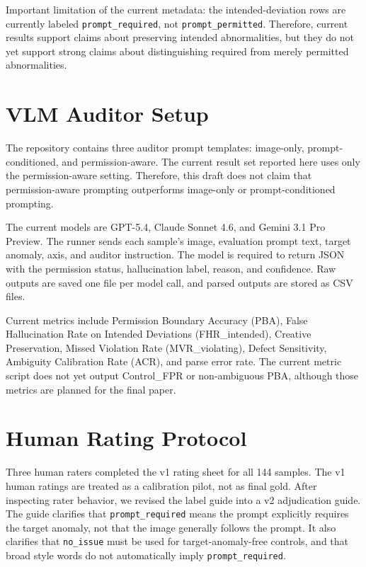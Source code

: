 \documentclass[11pt]{article}
\begin{document}
Important limitation of the current metadata: the intended-deviation rows are currently labeled \texttt{prompt\_required}, not \texttt{prompt\_permitted}. Therefore, current results support claims about preserving intended abnormalities, but they do not yet support strong claims about distinguishing required from merely permitted abnormalities.

\section{VLM Auditor Setup}

The repository contains three auditor prompt templates: image-only, prompt-conditioned, and permission-aware. The current result set reported here uses only the permission-aware setting. Therefore, this draft does not claim that permission-aware prompting outperforms image-only or prompt-conditioned prompting.

The current models are GPT-5.4, Claude Sonnet 4.6, and Gemini 3.1 Pro Preview. The runner sends each sample's image, evaluation prompt text, target anomaly, axis, and auditor instruction. The model is required to return JSON with the permission status, hallucination label, reason, and confidence. Raw outputs are saved one file per model call, and parsed outputs are stored as CSV files.

Current metrics include Permission Boundary Accuracy (PBA), False Hallucination Rate on Intended Deviations (FHR\_intended), Creative Preservation, Missed Violation Rate (MVR\_violating), Defect Sensitivity, Ambiguity Calibration Rate (ACR), and parse error rate. The current metric script does not yet output Control\_FPR or non-ambiguous PBA, although those metrics are planned for the final paper.

\section{Human Rating Protocol}

Three human raters completed the v1 rating sheet for all 144 samples. The v1 human ratings are treated as a calibration pilot, not as final gold. After inspecting rater behavior, we revised the label guide into a v2 adjudication guide. The guide clarifies that \texttt{prompt\_required} means the prompt explicitly requires the target anomaly, not that the image generally follows the prompt. It also clarifies that \texttt{no\_issue} must be used for target-anomaly-free controls, and that broad style words do not automatically imply \texttt{prompt\_required}.
\end{document}
